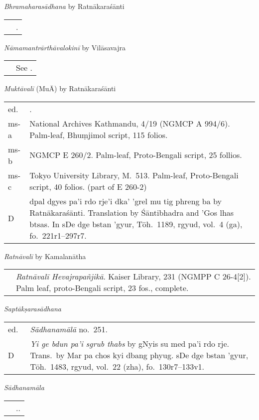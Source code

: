 \documentclass[12pt,twoside]{article}
\newcommand{\mybibexclude}[1]{\addtocategory{fullcited}{#1}}
\begin{document}
\noindent\emph{Bhramaharasādhana} by Ratnākaraśānti
\noindent\begin{longtable}{ p{} p{} }
	& \fullcite*{isaacson2002}.\mybibexclude{isaacson2002} 
\end{longtable}

\noindent\emph{Nāmamantrārthāvalokinī} by Vilāsavajra
\noindent\begin{longtable}{ p{} p{} }
	& See \textcite{tribe2016}.
\end{longtable}

\noindent\emph{Muktāvalī} (MuĀ) by Ratnākaraśānti
\noindent\begin{longtable}{ p{} p{} }
	ed. & \fullcite*{tripathi2001}.\mybibexclude{tripathi2001} \\
	ms-a & National Archives Kathmandu, 4/19 (NGMCP A 994/6). Palm-leaf, Bhuṃjimol script, 115 folios.\\
	ms-b & NGMCP E 260/2. Palm-leaf, Proto-Bengali script, 25 follios. \\
	ms-c & Tokyo University Library, M.\ 513. Palm-leaf, Proto-Bengali script, 40 folios. (part of E 260-2) \\
	D & dpal dgyes pa'i rdo rje'i dka' 'grel mu tig phreng ba by Ratnākaraśānti. Translation by Śāntibhadra and 'Gos lhas btsas. In sDe dge bstan 'gyur, Tōh.\ 1189, rgyud, vol.\ 4 (ga), fo.\ 221r1–297r7. 
\end{longtable}

\noindent\emph{Ratnāvalī} by Kamalanātha 
\noindent\begin{longtable}{ p{} p{} }
	&  \emph{Ratnāvalī Hevajrapañjikā}. Kaiser Library, 231 (NGMPP C 26-4[2]). Palm leaf, proto-Bengali script, 23 fos., complete. 
\end{longtable}

\noindent\emph{Saptākṣarasādhana} 
\noindent\begin{longtable}{ p{} p{} }
	ed.\ & \emph{Sādhanamālā} no.\ 251. \\
	D & \emph{Yi ge bdun pa'i sgrub thabs} by gNyis su med pa'i rdo rje. Trans.\ by Mar pa chos kyi dbang phyug. sDe dge bstan 'gyur, Tōh.\ 1483, rgyud, vol.\ 22 (zha), fo.\ 130r7–133v1. 
\end{longtable}

\noindent\emph{Sādhanamāla} 
\noindent\begin{longtable}{ p{} p{} }
	& \fullcite*{bhattacharyya1925}.\mybibexclude{bhattacharyya1925}.
\end{longtable}
\end{document}
